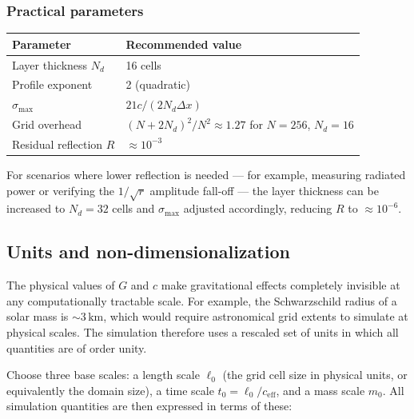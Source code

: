 \documentclass[11pt,a4paper]{article}
\begin{document}
\subsubsection*{Practical parameters}

\begin{center}
\begin{tabular}{@{}ll@{}}
\toprule
\textbf{Parameter} & \textbf{Recommended value} \\
\midrule
Layer thickness $N_d$ & 16 cells \\
Profile exponent & 2 (quadratic) \\
$\sigma_{\max}$ & $21c / (2 N_d \Delta x)$ \\
Grid overhead & $(N + 2N_d)^2 / N^2 \approx 1.27$ for $N=256$, $N_d=16$ \\
Residual reflection $R$ & $\approx 10^{-3}$ \\
\bottomrule
\end{tabular}
\end{center}

For scenarios where lower reflection is needed --- for example, measuring radiated power or verifying the $1/\sqrt{r}$ amplitude fall-off --- the layer thickness can be increased to $N_d = 32$ cells and $\sigma_{\max}$ adjusted accordingly, reducing $R$ to $\approx 10^{-6}$.

\subsection{Units and non-dimensionalization}
\label{sec:units}

The physical values of $G$ and $c$ make gravitational effects completely invisible at any computationally tractable scale.  For example, the Schwarzschild radius of a solar mass is $\sim 3\,\mathrm{km}$, which would require astronomical grid extents to simulate at physical scales.  The simulation therefore uses a rescaled set of units in which all quantities are of order unity.

Choose three base scales: a length scale $\ell_0$ (the grid cell size in physical units, or equivalently the domain size), a time scale $t_0 = \ell_0/c_{\mathrm{eff}}$, and a mass scale $m_0$.  All simulation quantities are then expressed in terms of these:
\end{document}
